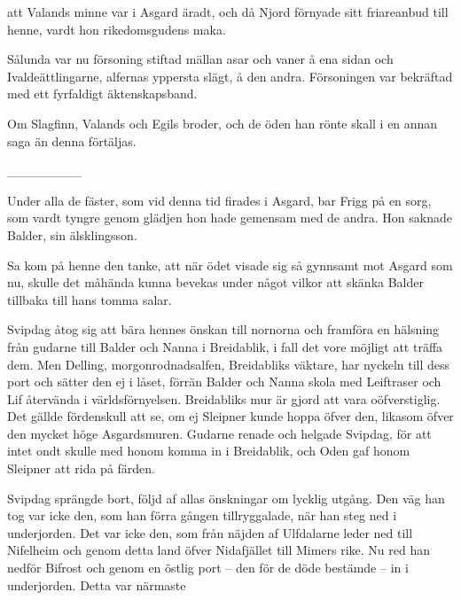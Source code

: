 att Valands minne var i Asgard äradt, och då Njord förnyade sitt
friareanbud till henne, vardt hon rikedomsgudens maka.

Sålunda var nu försoning stiftad mällan asar och vaner å ena sidan och
Ivaldeättlingarne, alfernas yppersta slägt, å den andra. Försoningen var
bekräftad med ett fyrfaldigt äktenskapsband.

Om Slagfinn, Valands och Egils broder, och de öden han rönte skall i en
annan saga än denna förtäljas.

{\_\_\_\_\_\_\_\_}

Under alla de fäster, som vid denna tid firades i Asgard, bar Frigg på
en sorg, som vardt tyngre genom glädjen hon hade gemensam med de andra.
Hon saknade Balder, sin älsklingsson.

Sa kom på henne den tanke, att när ödet visade sig så gynnsamt mot
Asgard som nu, skulle det måhända kunna bevekas under något vilkor att
skänka Balder tillbaka till hans tomma salar.

Svipdag åtog sig att bära hennes önskan till nornorna och framföra en
hälsning från gudarne till Balder och Nanna i Breidablik, i fall det
vore möjligt att träffa dem. Men Delling, morgonrodnadsalfen,
Breidabliks väktare, har nyckeln till dess port och sätter den ej i
låset, förrän Balder och Nanna skola med Leiftraser och Lif återvända i
världsförnyelsen. Breidabliks mur är gjord att vara oöfverstiglig. Det
gällde fördenskull att se, om ej Sleipner kunde hoppa öfver den, likasom
öfver den mycket höge Asgardsmuren. Gudarne renade och helgade Svipdag,
för att intet ondt skulle med honom komma in i Breidablik, och Oden gaf
honom Sleipner att rida på färden.

Svipdag sprängde bort, följd af allas önskningar om lycklig utgång. Den
väg han tog var icke den, som han förra gången tillryggalade, när han
steg ned i underjorden. Det var icke den, som från näjden af Ulfdalarne
leder ned till Nifelheim och genom detta land öfver Nidafjället till
Mimers rike. Nu red han nedför Bifrost och genom en östlig port -- den
för de döde bestämde -- in i underjorden. Detta var närmaste

